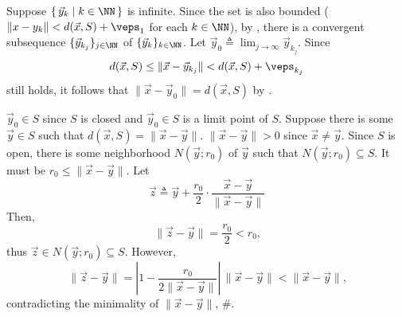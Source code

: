 \documentclass[MAS241_Note.tex]{subfiles}
\begin{document}
{\begin{enumerate}[nolistsep, label=(\roman*)]
            Suppose $\{\,\vec y_k \mid k \in \NN\,\}$ is infinite.
            Since the set is also bounded ($\|x-y_k\| < d(\vec x, S) + \veps_1$ for each $k \in \NN$),
            by , there is a convergent subsequence $\{\vec y_{k_j}\}_{j \in \NN}$ of $\{\vec y_k\}_{k \in \NN}$.
            Let $\vec y_0 \triangleq \lim_{j \to \infty} \vec y_{k_j}$. Since \[
                d(\vec x, S) \le \|\vec x-\vec y_{k_j}\| < d(\vec x, S) + \veps_{k_j}
            \] still holds, it follows that $\|\vec x-\vec y_0\| = d(\vec x, S)$ by .

            $\vec y_0 \in S$ since $S$ is closed and $\vec y_0 \in S$ is a limit point of $S$. \checkmark
        \ii Suppose there is some $\vec y \in S$ such that $d(\vec x, S) = \|\vec x-\vec y\|$.
            $\|\vec x - \vec y\| > 0$ since $\vec x \neq \vec y$.
            Since $S$ is open, there is some neighborhood $N(\vec y; r_0)$ of $\vec y$ such that $N(\vec y; r_0) \subseteq S$.
            It must be $r_0 \le \|\vec x - \vec y\|$. Let \[
                \vec z \triangleq \vec y + \frac{r_0}{2} \cdot \frac{\vec x - \vec y}{\|\vec x - \vec y\|}
            \]
            Then, \[
                \|\vec z - \vec y\| = \frac{r_0}{2} < r_0\text{,}
            \] thus $\vec z \in N(\vec y; r_0) \subseteq S$. However, \[
                \|\vec z - \vec y\| = \left| 1 - \frac{r_0}{2\|\vec x-\vec y\|} \right|\,\|\vec x-\vec y\| < \|\vec x - \vec y\|\text{,}
            \] contradicting the minimality of $\|\vec x- \vec y\|$, \#. \checkmark
    \end{enumerate}
}

\end{document}
